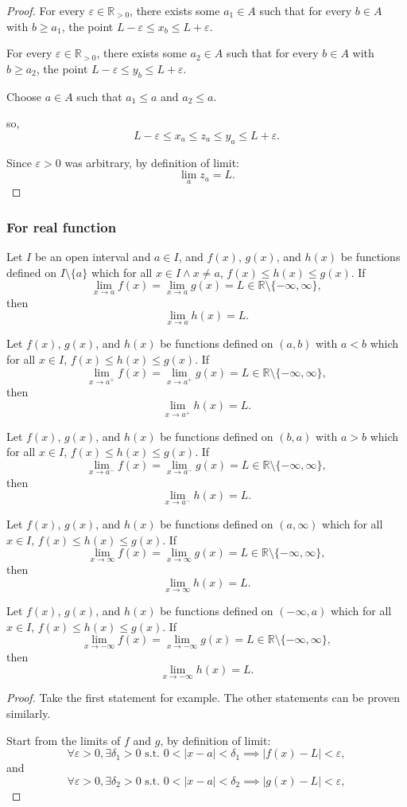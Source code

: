 \documentclass[a4paper,12pt]{report}
\begin{document}
\begin{itemize}
\begin{itemize}
\begin{proof}
For every $\varepsilon\in\mathbb{R}_{>0}$, there exists some $a_1\in A$ such that for every $b\in A$ with $b\geq a_1$, the point $L-\varepsilon\leq x_b\leq L+\varepsilon$.

For every $\varepsilon\in\mathbb{R}_{>0}$, there exists some $a_2\in A$ such that for every $b\in A$ with $b\geq a_2$, the point $L-\varepsilon\leq y_b\leq L+\varepsilon$.

Choose $a\in A$ such that $a_1\leq a$ and $a_2\leq a$.

so,
\[L-\varepsilon\leq x_{a}\leq z_{a}\leq y_{a}\leq L+\varepsilon.\]

Since $\varepsilon > 0$ was arbitrary, by definition of limit:
\[\lim_{a}z_a=L.\]
\end{proof}
\subsubsection{For real function}
Let $I$ be an open interval and $a\in I$, and $f(x)$, $g(x)$, and $h(x)$ be functions defined on $I\setminus\{a\}$ which for all $x\in I\land x\neq a$, $f(x)\leq h(x)\leq g(x)$. If
\[\lim_{x\to a}f(x)=\lim_{x\to a}g(x)=L\in\mathbb{R}\setminus\{-\infty,\infty\},\]
then
\[\lim_{x\to a}h(x)=L.\]

Let $f(x)$, $g(x)$, and $h(x)$ be functions defined on $(a,b)$ with $a<b$ which for all $x\in I$, $f(x)\leq h(x)\leq g(x)$. If
\[\lim_{x\to a^+}f(x)=\lim_{x\to a^+}g(x)=L\in\mathbb{R}\setminus\{-\infty,\infty\},\]
then
\[\lim_{x\to a^+}h(x)=L.\]

Let $f(x)$, $g(x)$, and $h(x)$ be functions defined on $(b,a)$ with $a>b$ which for all $x\in I$, $f(x)\leq h(x)\leq g(x)$. If
\[\lim_{x\to a^-}f(x)=\lim_{x\to a^-}g(x)=L\in\mathbb{R}\setminus\{-\infty,\infty\},\]
then
\[\lim_{x\to a^-}h(x)=L.\]

Let $f(x)$, $g(x)$, and $h(x)$ be functions defined on $(a,\infty)$ which for all $x\in I$, $f(x)\leq h(x)\leq g(x)$. If
\[\lim_{x\to\infty}f(x)=\lim_{x\to\infty}g(x)=L\in\mathbb{R}\setminus\{-\infty,\infty\},\]
then
\[\lim_{x\to\infty}h(x)=L.\]

Let $f(x)$, $g(x)$, and $h(x)$ be functions defined on $(-\infty,a)$ which for all $x\in I$, $f(x)\leq h(x)\leq g(x)$. If
\[\lim_{x\to-\infty}f(x)=\lim_{x\to-\infty}g(x)=L\in\mathbb{R}\setminus\{-\infty,\infty\},\]
then
\[\lim_{x\to-\infty}h(x)=L.\]
\begin{proof}
Take the first statement for example. The other statements can be proven similarly.

Start from the limits of $f$ and $g$, by definition of limit:
\[\forall\varepsilon>0, \exists\delta_1>0\text{\ s.t.\ }0<|x-a|<\delta_1\implies|f(x)-L|<\varepsilon,\]
and
\[\forall\varepsilon>0, \exists\delta_2>0\text{\ s.t.\ }0<|x-a|<\delta_2\implies|g(x)-L|<\varepsilon,\]


\end{proof}
\end{itemize}
\end{itemize}
\end{document}
